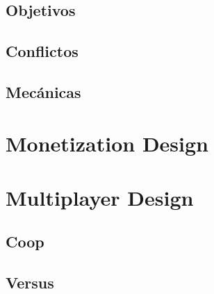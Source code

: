     \subsection{Objetivos}
    \subsection{Conflictos}
    \subsection{Mecánicas}

\section{Monetization Design}

\section{Multiplayer Design} \label{multiplayer}

    \subsection{Coop}
    \subsection{Versus}


